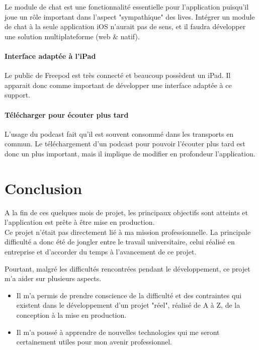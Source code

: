 \documentclass[11pt, french]{report}
\begin{document}
Le module de chat est une fonctionnalité essentielle pour l'application puisqu'il joue un rôle important dans l'aspect "sympathique" des lives. Intégrer un module de chat à la seule application iOS n'aurait pas de sens, et il faudra développer une solution multiplateforme (web \& natif).

\subsubsection{Interface adaptée à l'iPad}

Le public de Freepod est très connecté et beaucoup possèdent un iPad. Il apparait donc comme important de développer une interface adaptée à ce support.

\subsubsection{Télécharger pour écouter plus tard}

L'usage du podcast fait qu'il est souvent consommé dans les transports en commun. Le téléchargement d'un podcast pour pouvoir l'écouter plus tard est donc un plus important, mais il implique de modifier en profondeur l'application.


\chapter*{Conclusion}

A la fin de ces quelques mois de projet, les principaux objectifs sont atteints et l'application est prête à être mise en production.\\

Ce projet n'était pas directement lié à ma mission professionnelle. La principale difficulté a donc été de jongler entre le travail universitaire, celui réalisé en entreprise et d'accorder du temps à l'avancement de ce projet.

Pourtant, malgré les difficultés rencontrées pendant le développement, ce projet m'a aider sur plusieurs aspects.
\begin{itemize}
	\item Il m'a permis de prendre conscience de la difficulté et des contraintes qui existent dans le développement d'un projet "réel", réalisé de A à Z, de la conception à la mise en production.
	\item Il m'a poussé à apprendre de nouvelles technologies qui me seront certainement utiles pour mon avenir professionnel.\\
\end{itemize}
\end{document}
